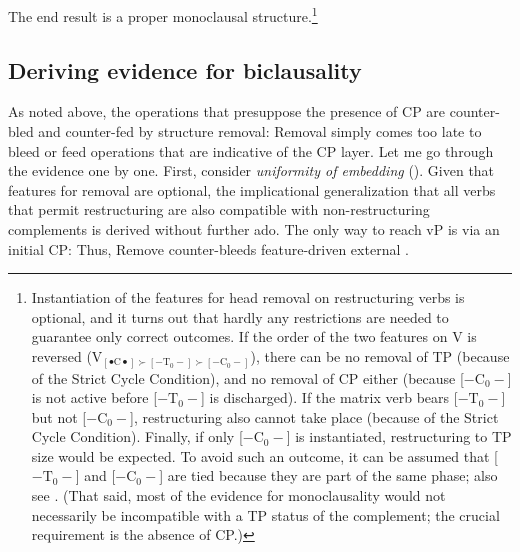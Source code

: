 \documentclass[output=paper]{langsci/langscibook}
\begin{document}

The end result is a proper monoclausal
structure.\footnote{\label{whytp}Instantiation of the features for head
removal on restructuring   verbs is optional, and it turns out that
hardly any restrictions are needed to guarantee only correct outcomes. If the
order of the two features on V is reversed (V$_{[\bullet\text{C}\bullet] \succ
[-\text{T}_0-] \succ [-\text{C}_0-]}$), there can be no removal of TP (because of the Strict
Cycle Condition), and no removal of CP either (because [$-\text{C}_0-$] is not
active before [$-\text{T}_0-$] is discharged).  If the matrix verb  bears
[$-\text{T}_0-$] but not [$-\text{C}_0-$], restructuring also cannot take place
(because of the Strict Cycle Condition). Finally, if only [$-\text{C}_0-$] is
instantiated, restructuring to TP size would be expected. To avoid such an
outcome, it can be assumed that [$-\text{T}_0-$] and [$-\text{C}_0-$] are tied
because they are part of the same phase; also see \cite{Pesetsky:16}. (That
said, most of the evidence for monoclausality would not necessarily be
incompatible with a TP status of the complement; the crucial requirement is the
absence of CP.)}

\subsection{Deriving evidence for biclausality}

As noted above, the operations that presuppose the presence of CP are
counter-bled and counter-fed by structure removal: Removal simply comes too
late to bleed or feed operations that are indicative of the CP layer. Let me
go through the evidence one by one. First, consider {\it uniformity of
embedding} ().  Given that features for removal are
optional, the implicational generalization that all  verbs that permit
restructuring are also compatible with non-restructuring complements is
derived without further ado. The only way to reach vP is via an initial CP:
Thus, Remove counter-bleeds feature-driven external .
\end{document}
